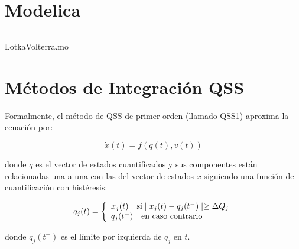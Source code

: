 \documentclass{beamer}
\begin{document}

\section{Modelica}
\begin{frame}[fragile]
\centering
\begin{listing}[H]    
	\inputminted[linenos]{modelica}{src/LotkaVolterra.mo}
	\caption{LotkaVolterra.mo}\label{lst:LotkaVolterra.mo}
\end{listing}
\end{frame}

\section{Métodos de Integración QSS}
\begin{frame}
	Formalmente, el método de QSS de primer orden (llamado QSS1) aproxima la ecuación por:
	
	\begin{equation}
	\dot{x}(t) = f (q(t), v(t))
	\end{equation}
	
	donde $q$ es el vector de estados cuantificados y sus componentes están relacionadas una a una con las del vector de estados $x$ siguiendo una 
	función de cuantificación con histéresis:
	
	\begin{equation}
	q_j(t) = \left\{ 
	  \begin{array}{l l}
	    x_j(t)  \quad \text{si} \mid x_j (t ) - q_j (t^{-} ) \mid \geq \Delta Q_j \\
	    q_j (t^{-} ) \quad \text{en caso contrario}
	  \end{array} \right.
	\end{equation}
	
	donde $q_j (t^{-})$ es el límite por izquierda de $q_j$ en $t$.
\end{frame}
\end{document}
